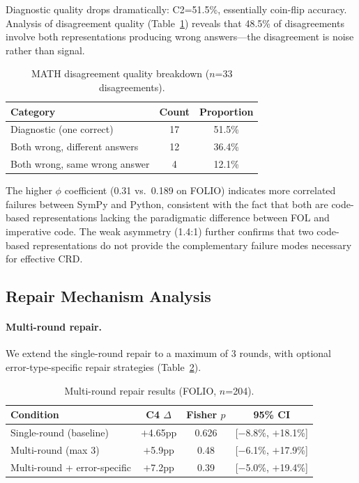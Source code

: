 \documentclass[11pt]{article}
\begin{document}
Diagnostic quality drops dramatically: C2=51.5\%, essentially coin-flip accuracy. Analysis of disagreement quality (Table~\ref{tab:math_quality}) reveals that 48.5\% of disagreements involve both representations producing wrong answers---the disagreement is noise rather than signal.

\begin{table}[t]
\centering
\caption{MATH disagreement quality breakdown ($n$=33 disagreements).}
\label{tab:math_quality}
\begin{tabular}{lcc}
\toprule
Category & Count & Proportion \\
\midrule
Diagnostic (one correct) & 17 & 51.5\% \\
Both wrong, different answers & 12 & 36.4\% \\
Both wrong, same wrong answer & 4 & 12.1\% \\
\bottomrule
\end{tabular}
\end{table}

The higher $\phi$ coefficient (0.31 vs.\ 0.189 on FOLIO) indicates more correlated failures between SymPy and Python, consistent with the fact that both are code-based representations lacking the paradigmatic difference between FOL and imperative code. The weak asymmetry (1.4:1) further confirms that two code-based representations do not provide the complementary failure modes necessary for effective CRD.

\subsection{Repair Mechanism Analysis}

\paragraph{Multi-round repair.} We extend the single-round repair to a maximum of 3 rounds, with optional error-type-specific repair strategies (Table~\ref{tab:multiround}).

\begin{table}[t]
\centering
\caption{Multi-round repair results (FOLIO, $n$=204).}
\label{tab:multiround}
\begin{tabular}{lccc}
\toprule
Condition & C4 $\Delta$ & Fisher $p$ & 95\% CI \\
\midrule
Single-round (baseline) & $+$4.65pp & 0.626 & [$-$8.8\%, $+$18.1\%] \\
Multi-round (max 3) & $+$5.9pp & 0.48 & [$-$6.1\%, $+$17.9\%] \\
Multi-round + error-specific & $+$7.2pp & 0.39 & [$-$5.0\%, $+$19.4\%] \\
\bottomrule
\end{tabular}
\end{table}
\end{document}
